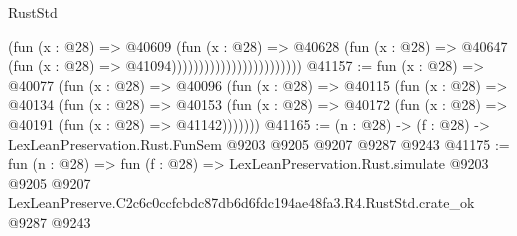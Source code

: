 \begin{lexlean}{RustStd}
\begin{coremodule}
                                            (fun (x : @28) =>
                                            @40609
                                              (fun (x : @28) =>
                                              @40628
                                                (fun (x : @28) =>
                                                @40647
                                                  (fun (x : @28) => @41094))))))))))))))))))))))))
@41157 := fun (x : @28) =>
  @40077
    (fun (x : @28) =>
    @40096
      (fun (x : @28) =>
      @40115
        (fun (x : @28) =>
        @40134
          (fun (x : @28) =>
          @40153 (fun (x : @28) => @40172 (fun (x : @28) => @40191 (fun (x : @28) => @41142)))))))
@41165 := (n : @28) -> (f : @28) -> LexLeanPreservation.Rust.FunSem @9203 @9205 @9207 @9287 @9243
@41175 := fun (n : @28) =>
  fun (f : @28) =>
  LexLeanPreservation.Rust.simulate
    @9203
    @9205
    @9207
    LexLeanPreserve.C2c6c0ccfcbdc87db6d6fdc194ae48fa3.R4.RustStd.crate_ok
    @9287
    @9243
\end{coremodule}
\end{lexlean}
